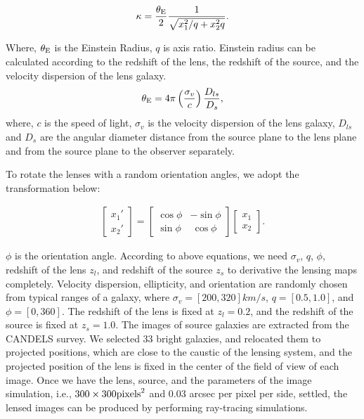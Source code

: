 \documentclass{emulateapj}
\begin{document}
\begin{equation}
\kappa = \frac{\theta_{\rm E}}{2}\frac{1}{\sqrt{x_1^2/q+x_2^2 q}}.
\end{equation}


Where, $\theta_{\rm E}$ is the Einstein Radius, $q$ is axis
ratio. Einstein radius can be calculated according to the redshift of
the lens, the redshift of the source, and the velocity dispersion of
the lens galaxy.
\begin{equation}
\theta_{\rm E} = 4\pi\left(\frac{\sigma_v}{c}\right)\frac{D_{ls}}{D_{s}}, 
\end{equation}
where, $c$ is the speed of light, $\sigma_v$ is the velocity
dispersion of the lens galaxy, $D_{ls}$ and $D_{s}$ are the angular
diameter distance from the source plane to the lens plane and from the
source plane to the observer separately.

To rotate the lenses with a random orientation angles, we adopt the
transformation below:

\begin{eqnarray}
\label{eq:rotation}
\begin{bmatrix}

    x_{1}\prime      \\
    x_{2}\prime 
\end{bmatrix}
= 
\begin{bmatrix}
    \cos \phi  &  -\sin \phi      \\
    \sin \phi  &  ~\cos \phi      
\end{bmatrix} 
\begin{bmatrix}
    x_1      \\
    x_2      
\end{bmatrix} .
\end{eqnarray}

$\phi$ is the orientation angle.  According to above equations, we
need $\sigma_v$, $q$, $\phi$, redshift of the lens $z_l$, and redshift
of the source $z_s$ to derivative the lensing maps completely.
Velocity dispersion, ellipticity, and orientation are randomly chosen
from typical ranges of a galaxy, where $\sigma_v = [200, 320] km/s$,
$q = [0.5, 1.0]$, and $\phi = [0, 360]$. The redshift of the lens is
fixed at $z_l = 0.2$, and the redshift of the source is fixed at $z_s
= 1.0$. The images of source galaxies are extracted from the CANDELS
survey. We selected 33 bright galaxies, and relocated them to
projected positions, which are close to the caustic of the lensing
system, and the projected position of the lens is fixed in the center
of the field of view of each image. Once we have the lens, source, and
the parameters of the image simulation, i.e., $300 \times 300 {\rm
  pixels}^2$ and 0.03 arcsec per pixel per side, settled, the lensed
images can be produced by performing ray-tracing simulations.
\end{document}
